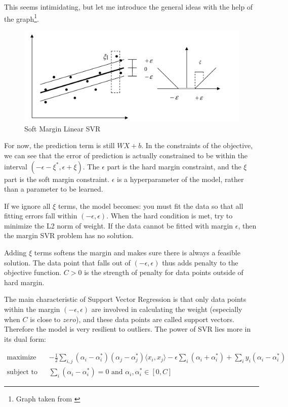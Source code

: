 \documentclass[a4paper]{article}
\begin{document}
This seems intimidating, but let me introduce the general ideas with the help of the graph\footnote{Graph taken from \cite{basak2007support}}.

\begin{figure}[H]
\includegraphics[width=\textwidth]{svr.png}
\caption{Soft Margin Linear SVR}
\end{figure}

For now, the prediction term is still $WX + b$. In the constraints of the objective, we can see that the error of prediction is actually constrained to be within the interval $(-\epsilon -\xi^*, \epsilon + \xi)$. The $\epsilon$ part is the hard margin constraint, and the $\xi$ part is the soft margin constraint. $\epsilon$ is a hyperparameter of the model, rather than a parameter to be learned. 

If we ignore all $\xi$ terms, the model becomes: you must fit the data so that all fitting errors fall within $(-\epsilon, \epsilon)$. When the hard condition is met, try to minimize the L2 norm of weight. If the data cannot be fitted with margin $\epsilon$, then the margin SVR problem has no solution. 

Adding $\xi$ terms softens the margin and makes sure there is always a feasible solution. The data point that falls out of $(-\epsilon, \epsilon)$ thus adds penalty to the objective function. $C > 0$ is the strength of penalty for data points outside of hard margin. 

The main characteristic of Support Vector Regression is that only data points within the margin $(-\epsilon, \epsilon)$ are involved in calculating the weight (especially when $C$ is close to $zero$), and these data points are called support vectors. Therefore the model is very resilient to outliers. The power of SVR lies more in its dual form:

\begin{align}
  \text{maximize} \quad & -\frac{1}{2} \sum_{i,j} (\alpha_i - \alpha_i^*) (\alpha_j - \alpha_j^*) \langle x_i, x_j \rangle - \epsilon \sum_i (\alpha_i + \alpha^*_i) + \sum_i y_i (\alpha_i - \alpha_i^*) \\
  \text{subject to} \quad & \sum_i (\alpha_i - \alpha_i^*) = 0 \text{ and } \alpha_i, \alpha_i^* \in [ 0, C ] 
\end{align}
\end{document}
